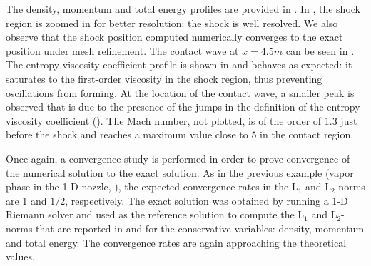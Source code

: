 %
\newpage
The density, momentum and total energy profiles are provided in . In , the shock region is zoomed in for better resolution: the shock is well resolved. We also observe that the shock position computed numerically converges to the exact position under mesh refinement. The contact wave at $x=4.5m$ can be seen in . The entropy viscosity coefficient profile is shown in  and behaves as expected: it saturates to the first-order viscosity in the shock region, thus preventing oscillations from forming. At the location of the contact wave, a smaller peak is observed that is due to the presence of the jumps in the definition of the entropy viscosity coefficient ().  The Mach number, not plotted, is of the order of $1.3$ just before the shock and reaches a maximum value close to $5$ in the contact region.

Once again, a convergence study is performed in order to prove convergence of the numerical solution to the exact solution. As in the previous example (vapor phase in the 1-D nozzle, ), the expected convergence rates in the L$_1$ and L$_2$ norms are 1 and $1/2$, respectively. The exact solution was obtained by running a 1-D Riemann solver and used as the reference solution to compute the L$_1$ and L$_2$-norms that are reported in  and  for the conservative variables: density, momentum and total energy. The convergence rates are again approaching the theoretical values.

